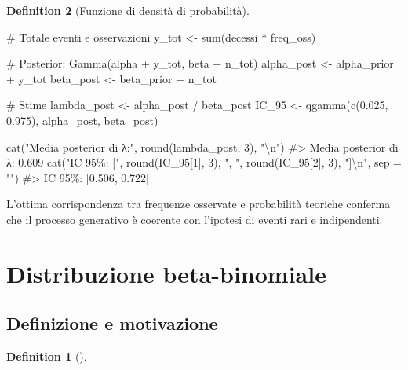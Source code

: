 \documentclass[
  letterpaper,
  DIV=11,
  numbers=noendperiod,
  oneside]{scrreprt}
\newenvironment{Shaded}{\begin{snugshade}}{\end{snugshade}}
\newcommand{\AttributeTok}[1]{\textcolor[rgb]{0.40,0.45,0.13}{#1}}
\newcommand{\CommentTok}[1]{\textcolor[rgb]{0.37,0.37,0.37}{#1}}
\newcommand{\DecValTok}[1]{\textcolor[rgb]{0.68,0.00,0.00}{#1}}
\newcommand{\FloatTok}[1]{\textcolor[rgb]{0.68,0.00,0.00}{#1}}
\newcommand{\FunctionTok}[1]{\textcolor[rgb]{0.28,0.35,0.67}{#1}}
\newcommand{\NormalTok}[1]{\textcolor[rgb]{0.00,0.23,0.31}{#1}}
\newcommand{\OtherTok}[1]{\textcolor[rgb]{0.00,0.23,0.31}{#1}}
\newcommand{\SpecialCharTok}[1]{\textcolor[rgb]{0.37,0.37,0.37}{#1}}
\newcommand{\StringTok}[1]{\textcolor[rgb]{0.13,0.47,0.30}{#1}}
\theoremstyle{definition}
\theoremstyle{plain}
\theoremstyle{definition}
\newtheorem{definition}{Definition}[chapter]
\theoremstyle{remark}
\begin{document}
\begin{definition}[Funzione di densità di
probabilità]
\begin{Shaded}
\begin{Highlighting}[]
\CommentTok{\# Totale eventi e osservazioni}
\NormalTok{y\_tot }\OtherTok{\textless{}{-}} \FunctionTok{sum}\NormalTok{(decessi }\SpecialCharTok{*}\NormalTok{ freq\_oss)}

\CommentTok{\# Posterior: Gamma(alpha + y\_tot, beta + n\_tot)}
\NormalTok{alpha\_post }\OtherTok{\textless{}{-}}\NormalTok{ alpha\_prior }\SpecialCharTok{+}\NormalTok{ y\_tot}
\NormalTok{beta\_post }\OtherTok{\textless{}{-}}\NormalTok{ beta\_prior }\SpecialCharTok{+}\NormalTok{ n\_tot}

\CommentTok{\# Stime}
\NormalTok{lambda\_post }\OtherTok{\textless{}{-}}\NormalTok{ alpha\_post }\SpecialCharTok{/}\NormalTok{ beta\_post}
\NormalTok{IC\_95 }\OtherTok{\textless{}{-}} \FunctionTok{qgamma}\NormalTok{(}\FunctionTok{c}\NormalTok{(}\FloatTok{0.025}\NormalTok{, }\FloatTok{0.975}\NormalTok{), alpha\_post, beta\_post)}

\FunctionTok{cat}\NormalTok{(}\StringTok{"Media posterior di λ:"}\NormalTok{, }\FunctionTok{round}\NormalTok{(lambda\_post, }\DecValTok{3}\NormalTok{), }\StringTok{"}\SpecialCharTok{\textbackslash{}n}\StringTok{"}\NormalTok{)}
\CommentTok{\#\textgreater{} Media posterior di λ: 0.609}
\FunctionTok{cat}\NormalTok{(}\StringTok{"IC 95\%: ["}\NormalTok{, }\FunctionTok{round}\NormalTok{(IC\_95[}\DecValTok{1}\NormalTok{], }\DecValTok{3}\NormalTok{), }\StringTok{", "}\NormalTok{, }\FunctionTok{round}\NormalTok{(IC\_95[}\DecValTok{2}\NormalTok{], }\DecValTok{3}\NormalTok{), }\StringTok{"]}\SpecialCharTok{\textbackslash{}n}\StringTok{"}\NormalTok{, }\AttributeTok{sep =} \StringTok{""}\NormalTok{)}
\CommentTok{\#\textgreater{} IC 95\%: [0.506, 0.722]}
\end{Highlighting}
\end{Shaded}

L'ottima corrispondenza tra frequenze osservate e probabilità teoriche
conferma che il processo generativo è coerente con l'ipotesi di eventi
rari e indipendenti.

\section{Distribuzione
beta-binomiale}\label{distribuzione-beta-binomiale}

\subsection{Definizione e motivazione}\label{definizione-e-motivazione}

\begin{definition}[]\protect\hypertarget{def-beta-binomial}{}\label{def-beta-binomial}


\end{definition}
\end{definition}
\end{document}
